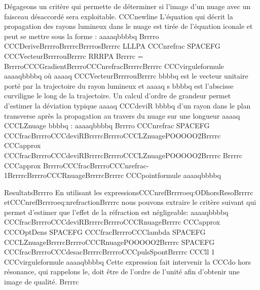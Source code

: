 Dégageons un critère qui permette de déterminer si l'image d'un nuage avec un faisceau désaccordé sera exploitable.
CCCnewline
L'équation qui décrit la propagation des rayons lumineux dans le nuage est tirée de l'équation iconale et peut se mettre sous la forme :
aaaaqbbbbq
Brrrro
CCCDeriveBrrrroBrrrrcBrrrrosBrrrrc LLLPA CCCnrefrac SPACEFG CCCVecteurBrrrrouBrrrrc  RRRPA Brrrrc
 = 
BrrrroCCCGradientBrrrroCCCnrefracBrrrrcBrrrrc
CCCvirguleformule
aaaaqbbbbq
où aaaaq CCCVecteurBrrrrouBrrrrc bbbbq est le vecteur unitaire porté par la trajectoire du rayon lumineux et aaaaq s bbbbq est l'abscisse curviligne le long de la trajectoire.
Un calcul d'ordre de grandeur permet d'estimer la déviation typique aaaaq CCCdeviR bbbbq d'un rayon dans le plan transverse après la propagation au travers du nuage sur une longueur aaaaq CCCLZnuage bbbbq :
aaaaqbbbbq
Brrrro
CCCnrefrac SPACEFG CCCfracBrrrroCCCdeviRBrrrrcBrrrroCCCLZnuagePOOOOO2Brrrrc CCCapprox CCCfracBrrrroCCCdeviRBrrrrcBrrrroCCCLZnuagePOOOOO2Brrrrc Brrrrc
 CCCapprox 
 BrrrroCCCfracBrrrroCCCnrefrac-1BrrrrcBrrrroCCCRnuageBrrrrcBrrrrc
 CCCpointformule
aaaaqbbbbq





ResultatsBrrrro
En utilisant les expressionsCCCnrefBrrrroeq:ODhorsResoBrrrrc etCCCnrefBrrrroeq:nrefractionBrrrrc nous pouvons extraire le critère suivant qui permet d'estimer que l'effet de la réfraction est négligeable:
aaaaqbbbbq
CCCfracBrrrroCCCdeviRBrrrrcBrrrroCCCRnuageBrrrrc CCCapprox 
CCCOptDens SPACEFG CCCfracBrrrroCCClambda SPACEFG CCCLZnuageBrrrrcBrrrroCCCRnuagePOOOOO2Brrrrc 
 SPACEFG  CCCfracBrrrroCCCdesacBrrrrcBrrrroCCCpulsSpontBrrrrc
CCCll 1
CCCvirguleformule
aaaaqbbbbq
Cette expression fait intervenir la CCCdo hors résonance, qui rappelons le, doit être de l'ordre de l'unité afin d'obtenir une image de qualité. 
Brrrrc




